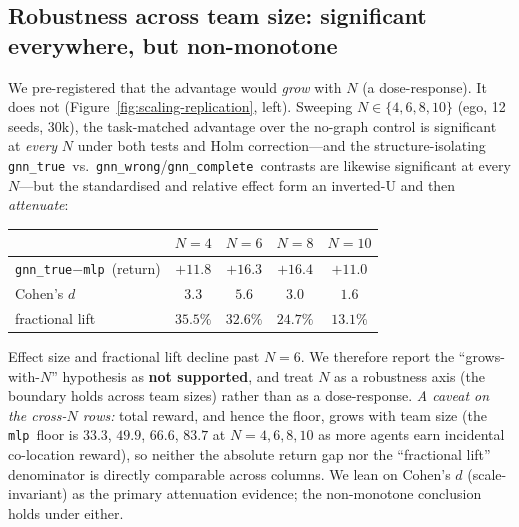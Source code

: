 \documentclass[manuscript, screen, review]{jair}
\newcommand{\gtrue}{\texttt{gnn\_true}}
\newcommand{\gwrong}{\texttt{gnn\_wrong}}
\newcommand{\gcomplete}{\texttt{gnn\_complete}}
\newcommand{\mlpc}{\texttt{mlp}}
\newcommand{\SCnFourGap}{+11.8}
\newcommand{\SCnFourD}{3.3}
\newcommand{\SCnSixGap}{+16.3}
\newcommand{\SCnSixD}{5.6}
\newcommand{\SCnEightGap}{+16.4}
\newcommand{\SCnEightD}{3.0}
\newcommand{\SCnTenGap}{+11.0}
\newcommand{\SCnTenD}{1.6}
\begin{document}
\subsection{Robustness across team size: significant everywhere, but non-monotone}
\label{sec:structure:N}

We pre-registered that the advantage would \emph{grow} with $N$ (a
dose-response). It does not (Figure~\ref{fig:scaling-replication}, left).
Sweeping $N\in\{4,6,8,10\}$ (ego, 12 seeds,
30k), the task-matched advantage over the no-graph control is significant at
\emph{every} $N$ under both tests and Holm correction---and the
structure-isolating \gtrue\ vs.\ \gwrong/\gcomplete\ contrasts are likewise
significant at every $N$---but the standardised and relative effect form an
inverted-U and then \emph{attenuate}:

\begin{center}\small
\begin{tabular}{lcccc}
  \toprule
  & $N{=}4$ & $N{=}6$ & $N{=}8$ & $N{=}10$ \\
  \midrule
  \gtrue$-$\mlpc\ (return) & $\SCnFourGap$ & $\SCnSixGap$ & $\SCnEightGap$ & $\SCnTenGap$ \\
  Cohen's $d$              & $\SCnFourD$   & $\SCnSixD$   & $\SCnEightD$   & $\SCnTenD$ \\
  fractional lift          & $35.5\%$ & $32.6\%$ & $24.7\%$ & $13.1\%$ \\
  \bottomrule
\end{tabular}
\end{center}

Effect size and fractional lift decline past $N{=}6$. We therefore report the
``grows-with-$N$'' hypothesis as \textbf{not supported}, and treat $N$ as a
robustness axis (the boundary holds across team sizes) rather than as a
dose-response. \emph{A caveat on the cross-$N$ rows:} total reward, and hence
the floor, grows with team size (the \mlpc\ floor is $33.3$, $49.9$, $66.6$,
$83.7$ at $N{=}4,6,8,10$ as more agents earn incidental co-location reward),
so neither the absolute return gap nor the ``fractional lift'' denominator is
directly comparable across columns. We lean on Cohen's $d$ (scale-invariant)
as the primary attenuation evidence; the non-monotone conclusion holds under
either.
\end{document}

